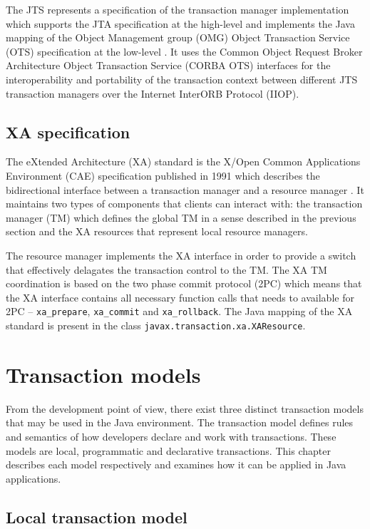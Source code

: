 \documentclass[oneside,
  digital, %
  table,   %
  nolof,     %
  nolot,     %
]{fithesis3}
\begin{document}
The JTS represents a specification of the transaction manager implementation which supports the JTA specification at the high-level and implements the Java mapping of the Object Management group (OMG) Object Transaction Service (OTS) specification at the low-level \cite{jts}. It uses the Common Object Request Broker Architecture Object Transaction Service (CORBA OTS) interfaces for the interoperability and portability of the transaction context between different JTS transaction managers over the Internet InterORB Protocol (IIOP).

\subsection{XA specification}

The eXtended Architecture (XA) standard is the X/Open Common Applications Environment (CAE) specification published in 1991 which describes the bidirectional interface between a transaction manager and a resource manager \cite{xa_spec}. It maintains two types of components that clients can interact with: the transaction manager (TM) which defines the global TM in a sense described in the previous section and the XA resources that represent local resource managers.

The resource manager implements the XA interface in order to provide a switch that effectively delagates the transaction control to the TM. The XA TM coordination is based on the two phase commit protocol (2PC) which means that the XA interface contains all necessary function calls that needs to available for 2PC -- \texttt{xa\_prepare}, \texttt{xa\_commit} and \texttt{xa\_rollback}. The Java mapping of the XA standard is present in the class \texttt{javax.transaction.xa.XAResource}.



\section{Transaction models}

From the development point of view, there exist three distinct transaction models that may be used in the Java environment. The transaction model defines rules and semantics of how developers declare and work with transactions. These models are local, programmatic and declarative transactions. This chapter describes each model respectively and examines how it can be applied in Java applications.

\subsection{Local transaction model}
\end{document}

